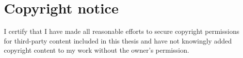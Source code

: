 

\section*{Copyright notice}

%
%
%
%


I certify that I have made all reasonable efforts to secure copyright permissions for third-party content included in this thesis and have not knowingly added copyright content to my work without the owner's permission.


